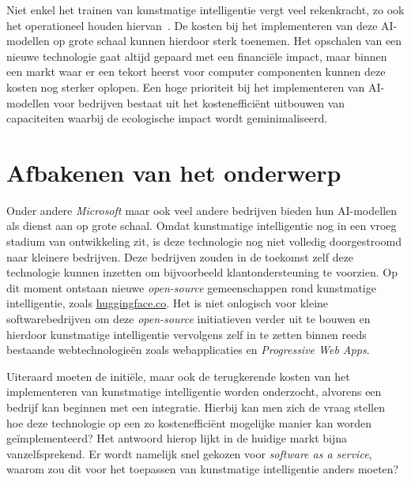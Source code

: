 \bigbreak{}

Niet enkel het trainen van kunstmatige intelligentie vergt veel rekenkracht, zo ook het operationeel houden hiervan~\autocite{Patel2023}. De kosten bij het implementeren van deze AI-modellen op grote schaal kunnen hierdoor sterk toenemen. Het opschalen van een nieuwe technologie gaat altijd gepaard met een financiële impact, maar binnen een markt waar er een tekort heerst voor computer componenten  kunnen deze kosten nog sterker oplopen. Een hoge prioriteit bij het implementeren van AI-modellen voor bedrijven bestaat uit het kostenefficiënt uitbouwen van capaciteiten waarbij de ecologische impact wordt geminimaliseerd.

\bigbreak{}

\section{Afbakenen van het onderwerp}

Onder andere \textit{Microsoft} maar ook veel andere bedrijven bieden hun AI-modellen als dienst aan op grote schaal. Omdat kunstmatige intelligentie nog in een vroeg stadium van ontwikkeling zit, is deze technologie nog niet volledig doorgestroomd naar kleinere bedrijven. Deze bedrijven zouden in de toekomst zelf deze technologie kunnen inzetten om bijvoorbeeld klant\-on\-der\-steu\-ning te voorzien. Op dit moment ontstaan nieuwe \textit{open-source} gemeenschappen rond kunstmatige intelligentie, zoals \href{https://huggingface.co/}{huggingface.co}. Het is niet onlogisch voor kleine softwarebedrijven om deze \textit{open-source} initiatieven verder uit te bouwen en hierdoor kunstmatige intelligentie vervolgens zelf in te zetten binnen reeds bestaande webtechnologieën zoals web\-app\-li\-ca\-ties en \textit{Progressive Web Apps}.

\bigbreak{}

Uiteraard moeten de initiële, maar ook de terugkerende kosten van het implementeren van kunstmatige intelligentie worden onderzocht, alvorens een bedrijf kan beginnen met een integratie. Hierbij kan men zich de vraag stellen hoe deze technologie op een zo kostenefficiënt mogelijke manier kan worden geïmplementeerd? Het antwoord hierop lijkt in de huidige markt bijna vanzelfsprekend. Er wordt namelijk snel gekozen voor \textit{software as a service}, waarom zou dit voor het toepassen van kunstmatige intelligentie anders moeten?

\section{}%
\label{sec:probleemstelling}

